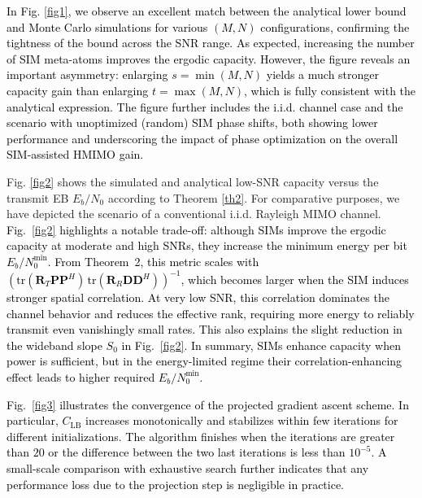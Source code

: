 \documentclass[twocolumn,10pt]{IEEEtran}
\begin{document}
	\textcolor{black}{In Fig. \ref{fig1}, we  observe an excellent match
	between the analytical lower bound and Monte Carlo simulations for
	various $(M,N)$ configurations, confirming the tightness of the bound
	across the SNR range. As expected, increasing the number of SIM
	meta-atoms improves the ergodic capacity. However, the figure reveals an
	important asymmetry: enlarging $s=\min(M,N)$ yields a much stronger
	capacity gain than enlarging $t=\max(M,N)$, which  is fully
	consistent with the analytical expression. The figure further includes the i.i.d. channel case and the
	scenario with unoptimized (random) SIM phase shifts, both showing 
	lower performance and underscoring the impact of phase optimization on
	the overall SIM-assisted HMIMO gain.}
	
	Fig. \ref{fig2} shows the simulated and analytical low-SNR capacity versus the transmit EB ${E_{b}}/{N_{0}}$ according to Theorem \ref{th2}. For comparative purposes, we have depicted the scenario of a conventional i.i.d. Rayleigh MIMO channel. \textcolor{black}{Fig.~\ref{fig2} highlights a notable trade-off: although SIMs improve the
		ergodic capacity at moderate and high SNRs, they increase the minimum
		energy per bit $E_b/N_0^{\min}$. From Theorem~2, this metric scales with
		$(\mathrm{tr}(\mathbf{R}_T\mathbf{P}\mathbf{P}^H)\,
		\mathrm{tr}(\mathbf{R}_R\mathbf{D}\mathbf{D}^H))^{-1}$, which becomes
		larger when the SIM induces stronger spatial correlation. At very low SNR, this correlation dominates the
		channel behavior and reduces the effective rank, requiring more energy
		to reliably transmit even vanishingly small rates. This also explains
		the slight reduction in the wideband slope $S_0$ in Fig.~\ref{fig2}. In summary,
		SIMs enhance capacity when power is sufficient, but in the energy-limited
		regime their correlation-enhancing effect leads to higher required
		$E_b/N_0^{\min}$.}
		
		\textcolor{black}{			Fig.~\ref{fig3} illustrates the convergence  of the projected gradient ascent scheme. In particular, $C_{\mathrm{LB}}$ increases monotonically and stabilizes within few
			iterations for different initializations. The algorithm finishes  when the iterations are greater than $20$ or the difference  between the two last iterations is less than $10^{-5}$. A small-scale comparison with
			exhaustive search further indicates that any performance loss due to the
			projection step is negligible in practice. }
%	
	
\end{document}
